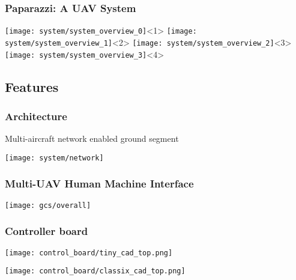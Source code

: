 
\begin{frame}
  \frametitle{Paparazzi: A UAV System}

  \begin{center}
    \texttt{[image: system/system\_overview\_0]}<1>
    \texttt{[image: system/system\_overview\_1]}<2>
    \texttt{[image: system/system\_overview\_2]}<3>
    \texttt{[image: system/system\_overview\_3]}<4>
  \end{center}
\end{frame}

%
%
\subsection{Features}



%
\begin{frame}
\frametitle{Architecture}
\begin{center}
Multi-aircraft network enabled ground segment
\end{center}
\begin{center}
\texttt{[image: system/network]}
\end{center}
\end{frame}




%
\begin{frame}
  \frametitle{Multi-UAV Human Machine Interface}

  \begin{center}
    \texttt{[image: gcs/overall]}
  \end{center}
\end{frame}


%
\begin{frame}
  \frametitle{Controller board}
  \begin{center}
    \texttt{[image: control\_board/tiny\_cad\_top.png]}
   
    \texttt{[image: control\_board/classix\_cad\_top.png]}    
  \end{center}
\end{frame}


%



